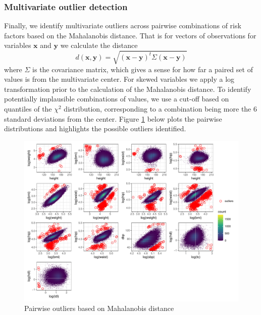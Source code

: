 \documentclass[12pt]{article}
\begin{document}
\begin{appendix}
    \subsubsection{Multivariate outlier detection}
    Finally, we identify multivariate outliers across pairwise combinations of risk factors based on the Mahalanobis distance. That is for vectors of observations for variables $\mathbf{x}$ and $\mathbf{y}$ we calculate the distance
    $$d(\mathbf{x}, \mathbf{y}) = \sqrt{(\mathbf{x} - \mathbf{y})^t \Sigma (\mathbf{x} - \mathbf{y})}$$
    where $\Sigma$ is the covariance matrix, which gives a sense for how far a paired set of values is from the multivariate center. For skewed variables we apply a log transformation prior to the calculation of the Mahalanobis distance. To identify potentially implausible combinations of values, we use a cut-off based on quantiles of the $\chi^2$ distribution, corresponding to a combination being more the 6 standard deviations from the center. Figure \ref{fig:pairs} below plots the pairwise distributions and highlights the possible outliers identified. 

    \begin{figure}[H]
        \centering
        \includegraphics[width = \linewidth]{../3_figures/figS2_maha_outliers.pdf}
        \caption{Pairwise outliers based on Mahalanobis distance}
        \label{fig:pairs}
    \end{figure}


\end{appendix}
\end{document}
